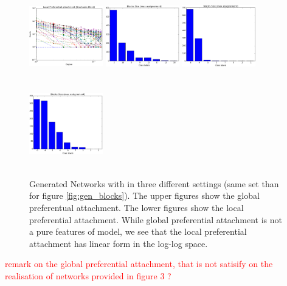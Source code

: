 \begin{figure}[h]
	\endminipage
	\includegraphics[width=3.2cm, height=3.7cm]{img/M_g_regular/figure_3}
	\endminipage
		\vspace{-0.4cm}
	\includegraphics[width=3.2cm, height=3.7cm]{img/M_g_peaks/figure_5}
	\endminipage
	\includegraphics[width=3.2cm, height=3.7cm]{img/M_g_power_law/figure_5} 
	\endminipage
	\includegraphics[width=3.2cm, height=3.7cm]{img/M_g_regular/figure_5}
	\endminipage
	\caption{Generated Networks with in three different settings (same set than for figure \ref{fig:gen_blocks}). The upper figures show the global preferentual attachment. The lower figures show the local preferential attachment. While global preferential attachment is not a pure features of model, we see that the local preferential attachment has linear form in the log-log space.}
	\label{fig:gen_burst_mmsb}
\end{figure}

\textcolor{red}{remark on the global preferential attachment, that is not satisify on the realisation of networks provided in figure 3 ?}


